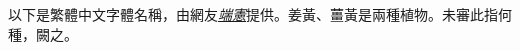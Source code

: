 \documentclass[fontset=fandol]{ctexart}
\begin{document}
\begin{RaggedRight}
\end{RaggedRight}

\clearpage

以下是繁體中文字體名稱，由網友\href{https://github.com/heangfat}{\emph{端憲}}提供。姜黃、薑黃是兩種植物。未審此指何種，闕之。

\bigskip
\end{document}
